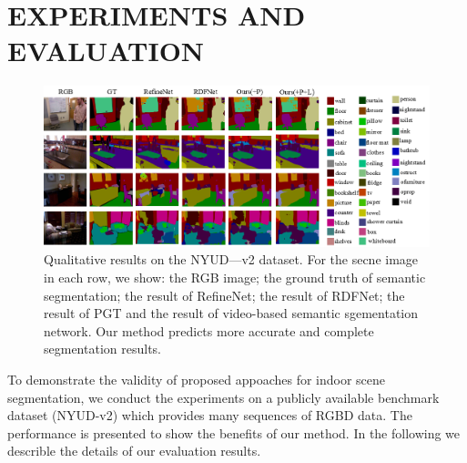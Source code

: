 \section{EXPERIMENTS AND EVALUATION}
\label{sec:exper}
\begin{figure}[!th]
	\centering
	\includegraphics[scale=0.63]{figure/Result.png}
	\caption{Qualitative results on the NYUD—v2 dataset. For the secne image in each row, we show: the RGB image; the ground truth of semantic segmentation; the result of RefineNet; the result of RDFNet; the result of PGT and the result of video-based semantic sgementation network. Our method predicts more accurate and complete segmentation results.}
	\label{fig:VisResult}
\end{figure}
To demonstrate the validity of proposed appoaches for indoor scene segmentation, we conduct the experiments on a publicly available benchmark dataset (NYUD-v2) which provides many sequences of RGBD data. 
%
The performance is presented to show the benefits of our method.
%
In the following we describle the details of our evaluation results.


